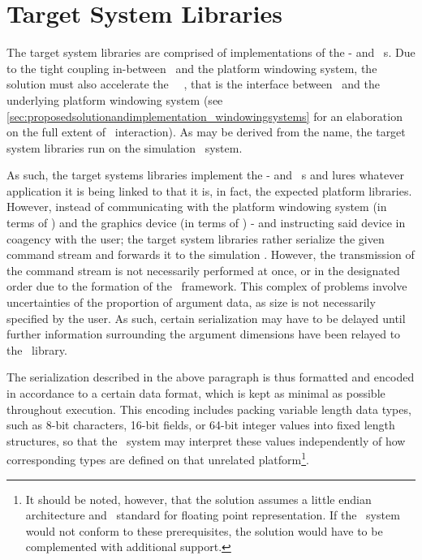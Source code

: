 \section{Target System Libraries}
\label{sec:proposedsolutionandimplementation_targetsystemlibraries}
The target system libraries are comprised of implementations of the \dvttermegl - and \dvttermopengl\ \dvttermapi s.
Due to the tight coupling in-between \dvttermopengl\ and the platform windowing system, the solution must also accelerate the \dvttermkhronos\ \dvttermegl\ \dvttermapi , that is the interface between \dvttermopengl\ and the underlying platform windowing system (see \ref{sec:proposedsolutionandimplementation_windowingsystems} for an elaboration on the full extent of \dvttermegl\ interaction).
As may be derived from the name, the target system libraries run on the simulation \dvttermtarget\ system.

As such, the target systems libraries implement the \dvttermegl - and \dvttermopenglestwopointo\ \dvttermapi s and lures whatever application it is being linked to that it is, in fact, the expected platform libraries.
However, instead of communicating with the platform windowing system (in terms of \dvttermegl ) and the graphics device (in terms of \dvttermopengl ) - and instructing said device in coagency with the user; the target system libraries rather serialize the given command stream and forwards it to the simulation \dvttermhost .
However, the transmission of the command stream is not necessarily performed at once, or in the designated order due to the formation of the \dvttermopenglestwopointo\ framework.
This complex of problems involve uncertainties of the proportion of argument data, as size is not necessarily specified by the user.
As such, certain serialization may have to be delayed until further information surrounding the argument	dimensions have been relayed to the \dvttermopengl\ library.

The serialization described in the above paragraph is thus formatted and encoded in accordance to a certain data format, which is kept as minimal as possible throughout execution.
This encoding includes packing variable length data types, such as 8-bit characters, 16-bit fields, or 64-bit integer values into fixed length structures, so that the \dvttermhost\ system may interpret these values independently of how corresponding types are defined on that unrelated platform\footnote{It should be noted, however, that the solution assumes a little endian architecture and \dvttermieeefp\ standard for floating point representation. If the \dvttermhost\ system would not conform to these prerequisites, the solution would have to be complemented with additional support.}.

